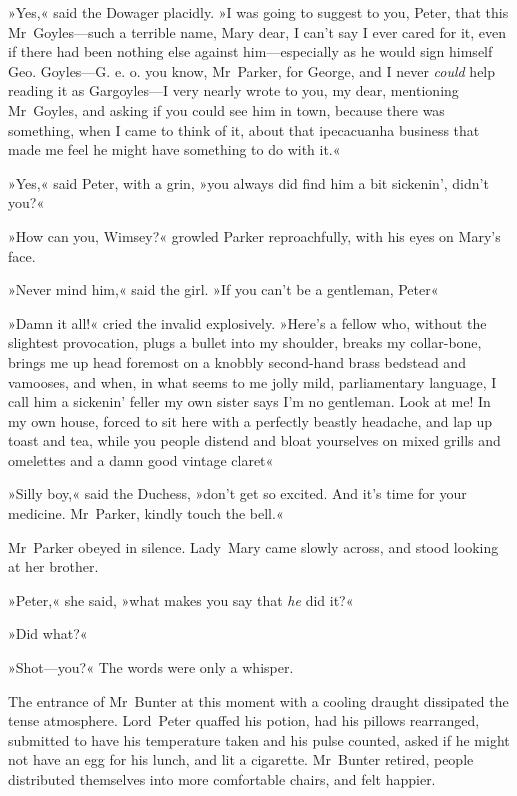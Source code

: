 »Yes,« said the Dowager placidly. »I was going to suggest to you, Peter, that this Mr~Goyles—such a terrible name, Mary dear, I can't say I ever cared for it, even if there had been nothing else against him—especially as he would sign himself Geo. Goyles—G. e. o. you know, Mr~Parker, for George, and I never \textit{could} help reading it as Gargoyles—I very nearly wrote to you, my dear, mentioning Mr~Goyles, and asking if you could see him in town, because there was something, when I came to think of it, about that ipecacuanha business that made me feel he might have something to do with it.«

»Yes,« said Peter, with a grin, »you always did find him a bit sickenin', didn't you?«

»How can you, Wimsey?« growled Parker reproachfully, with his eyes on Mary's face.

»Never mind him,« said the girl. »If you can't be a gentleman, Peter\longdash«

»Damn it all!« cried the invalid explosively. »Here's a fellow who, without the slightest provocation, plugs a bullet into my shoulder, breaks my collar-bone, brings me up head foremost on a knobbly second-hand brass bedstead and vamooses, and when, in what seems to me jolly mild, parliamentary language, I call him a sickenin' feller my own sister says I'm no gentleman. Look at me! In my own house, forced to sit here with a perfectly beastly headache, and lap up toast and tea, while you people distend and bloat yourselves on mixed grills and omelettes and a damn good vintage claret\longdash«

»Silly boy,« said the Duchess, »don't get so excited. And it's time for your medicine. Mr~Parker, kindly touch the bell.«

Mr~Parker obeyed in silence. Lady~Mary came slowly across, and stood looking at her brother.

»Peter,« she said, »what makes you say that \textit{he} did it?«

»Did what?«

»Shot—you?« The words were only a whisper.

The entrance of Mr~Bunter at this moment with a cooling draught dissipated the tense atmosphere. Lord~Peter quaffed his potion, had his pillows rearranged, submitted to have his temperature taken and his pulse counted, asked if he might not have an egg for his lunch, and lit a cigarette. Mr~Bunter retired, people distributed themselves into more comfortable chairs, and felt happier.

